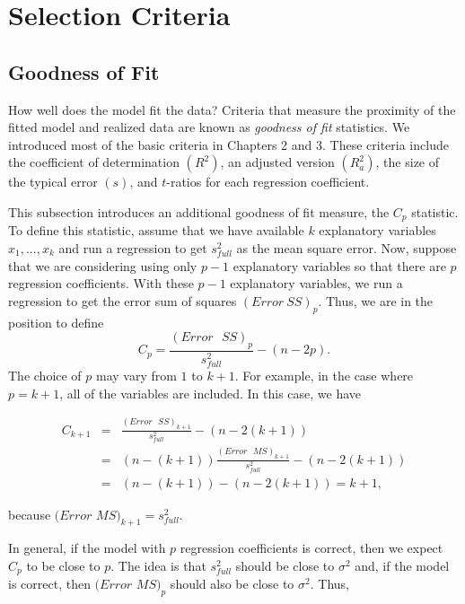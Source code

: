 \section{Selection Criteria}


\subsection{Goodness of Fit}

How well does the model fit the data? Criteria that measure the
proximity of the fitted model and realized data are known as
\emph{goodness of fit} statistics. We introduced most of the basic
criteria in Chapters 2 and 3. These criteria include the coefficient
of determination $(R^{2})$, an adjusted version $(R_{a}^{2})$, the
size of the typical error $(s)$, and $t$-ratios for each regression
coefficient.

This subsection introduces an additional goodness of fit measure,
the $C_p$ statistic. To define this statistic, assume that we have
available $k$ explanatory variables $x_{1},...,x_{k}$ and run a
regression to get $s_{full}^{2}$ as the mean square error. Now,
suppose that we are considering using only $p-1$ explanatory
variables so that there are $p$ regression coefficients. With these
$p-1$ explanatory variables, we run a regression to get the error
sum of squares $(Error~SS)_p$. Thus, we are in the position to
define
\begin{equation*}
C_{p}=\frac{(Error\text{ }SS)_p}{s_{full}^{2}}-(n-2p).
\end{equation*}
The choice of $p$ may vary from $1$ to $k+1$. For example, in the case where
$p=k+1$, all of the variables are included. In this case, we have

\begin{center}
\begin{eqnarray*}
C_{k+1} &=&\frac{(Error\text{ }SS)_{k+1}}{s_{full}^{2}}-(n-2(k+1)) \\
&=&(n-(k+1))\frac{(Error\text{ }MS)_{k+1}}{s_{full}^{2}}-(n-2(k+1)) \\
&=&(n-(k+1))-(n-2(k+1))=k+1,
\end{eqnarray*}
\end{center}

\noindent because $(Error$ $MS)_{k+1}=s_{full}^{2}$.

In general, if the model with $p$ regression coefficients is correct, then
we expect $C_{p}$ to be close to $p$. The idea is that $s_{full}^{2}$ should
be close to $\sigma ^{2}$ and, if the model is correct, then $(Error$ $%
MS)_{p}$ should also be close to $\sigma ^{2}$. Thus,

